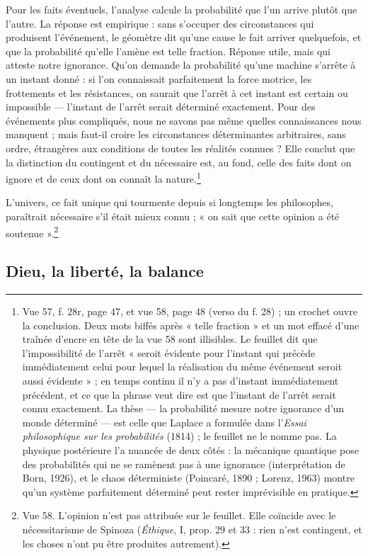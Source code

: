 \documentclass[11pt,a4paper]{article}
\begin{document}
Pour les faits éventuels, l'analyse calcule la probabilité que l'un arrive
plutôt que l'autre. La réponse est empirique : sans s'occuper des circonstances
qui produisent l'événement, le géomètre dit qu'une cause le fait arriver
quelquefois, et que la probabilité qu'elle l'amène est telle fraction. Réponse
utile, mais qui atteste notre ignorance. Qu'on demande la probabilité qu'une
machine s'arrête à un instant donné : si l'on connaissait parfaitement la force
motrice, les frottements et les résistances, on saurait que l'arrêt à cet
instant est certain ou impossible — l'instant de l'arrêt serait déterminé
exactement. Pour des événements plus compliqués, nous ne savons pas même quelles
connaissances nous manquent ; mais faut-il croire les circonstances
déterminantes arbitraires, sans ordre, étrangères aux conditions de toutes les
réalités connues ? Elle conclut que la distinction du contingent et du
nécessaire est, au fond, celle des faits dont on ignore et de ceux dont on
connaît la nature.\footnote{Vue 57, f. 28r, page 47, et vue 58, page 48 (verso
du f. 28) ; un crochet ouvre la conclusion. Deux mots biffés après « telle
fraction » et un mot effacé d'une traînée d'encre en tête de la vue 58 sont
illisibles. Le feuillet dit que l'impossibilité de l'arrêt « seroit évidente
pour l'instant qui précède immédiatement celui pour lequel la réalisation du
même événement seroit aussi évidente » ; en temps continu il n'y a pas
d'instant immédiatement précédent, et ce que la phrase veut dire est que
l'instant de l'arrêt serait connu exactement. La thèse — la probabilité mesure
notre ignorance d'un monde déterminé — est celle que Laplace a formulée dans
l'\emph{Essai philosophique sur les probabilités} (1814) ; le feuillet ne le
nomme pas. La physique postérieure l'a nuancée de deux côtés : la mécanique
quantique pose des probabilités qui ne se ramènent pas à une ignorance
(interprétation de Born, 1926), et le chaos déterministe (Poincaré, 1890 ;
Lorenz, 1963) montre qu'un système parfaitement déterminé peut rester
imprévisible en pratique.}

L'univers, ce fait unique qui tourmente depuis si longtemps les philosophes,
paraîtrait nécessaire s'il était mieux connu ; « on sait que cette opinion a été
soutenue ».\footnote{Vue 58. L'opinion n'est pas attribuée sur le feuillet. Elle
coïncide avec le nécessitarisme de Spinoza (\emph{Éthique}, I, prop. 29 et 33 :
rien n'est contingent, et les choses n'ont pu être produites autrement).}

\subsection*{Dieu, la liberté, la balance}
\end{document}
